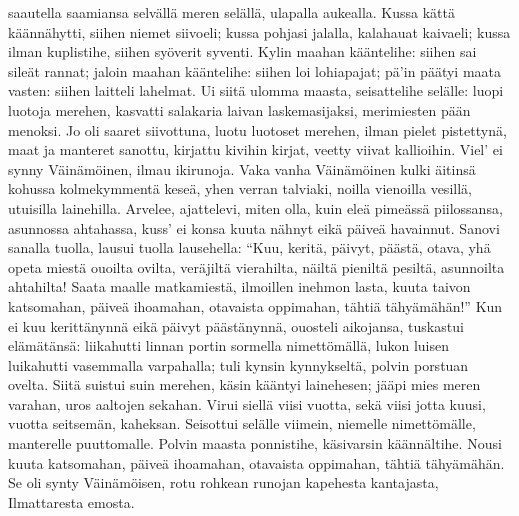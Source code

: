     saautella saamiansa
  \endverse
  \beginverse
    selvällä meren selällä,
    ulapalla aukealla.
    Kussa kättä käännähytti,
    siihen niemet siivoeli;
    kussa pohjasi jalalla,
    kalahauat kaivaeli;
    kussa ilman kuplistihe,
    siihen syöverit syventi.
  \endverse
  \beginverse
    Kylin maahan kääntelihe:
    siihen sai sileät rannat;
  \endverse
  \beginverse
    jaloin maahan kääntelihe:
    siihen loi lohiapajat;
    pä'in päätyi maata vasten:
    siihen laitteli lahelmat.
    Ui siitä ulomma maasta,
    seisattelihe selälle:
    luopi luotoja merehen,
    kasvatti salakaria
    laivan laskemasijaksi,
    merimiesten pään menoksi.
  \endverse
  \beginverse
    Jo oli saaret siivottuna,
    luotu luotoset merehen,
    ilman pielet pistettynä,
    maat ja manteret sanottu,
    kirjattu kivihin kirjat,
    veetty viivat kallioihin.
    Viel' ei synny Väinämöinen,
    ilmau ikirunoja.
    Vaka vanha Väinämöinen
    kulki äitinsä kohussa
  \endverse
  \beginverse
    kolmekymmentä keseä,
    yhen verran talviaki,
    noilla vienoilla vesillä,
    utuisilla lainehilla.
    Arvelee, ajattelevi,
    miten olla, kuin eleä
    pimeässä piilossansa,
    asunnossa ahtahassa,
    kuss' ei konsa kuuta nähnyt
    eikä päiveä havainnut.
  \endverse
  \beginverse
    Sanovi sanalla tuolla,
    lausui tuolla lausehella:
    ``Kuu, keritä, päivyt, päästä,
    otava, yhä opeta
    miestä ouoilta ovilta,
    veräjiltä vierahilta,
    näiltä pieniltä pesiltä,
    asunnoilta ahtahilta!
    Saata maalle matkamiestä,
    ilmoillen inehmon lasta,
    kuuta taivon katsomahan,
    päiveä ihoamahan,
    otavaista oppimahan,
    tähtiä tähyämähän!''
    Kun ei kuu kerittänynnä
    eikä päivyt päästänynnä,
    ouosteli aikojansa,
    tuskastui elämätänsä:
    liikahutti linnan portin
    sormella nimettömällä,
  \endverse
  \beginverse
    lukon luisen luikahutti
    vasemmalla varpahalla;
    tuli kynsin kynnykseltä,
    polvin porstuan ovelta.
    Siitä suistui suin merehen,
    käsin kääntyi lainehesen;
    jääpi mies meren varahan,
    uros aaltojen sekahan.
  \endverse
  \beginverse
    Virui siellä viisi vuotta,
    sekä viisi jotta kuusi,
  \endverse
  \beginverse
    vuotta seitsemän, kaheksan.
    Seisottui selälle viimein,
    niemelle nimettömälle,
    manterelle puuttomalle.
    Polvin maasta ponnistihe,
    käsivarsin käännältihe.
    Nousi kuuta katsomahan,
    päiveä ihoamahan,
    otavaista oppimahan,
    tähtiä tähyämähän.
  \endverse
  \beginverse
    Se oli synty Väinämöisen,
    rotu rohkean runojan
    kapehesta kantajasta,
    Ilmattaresta emosta.
  \endverse
\endsong


